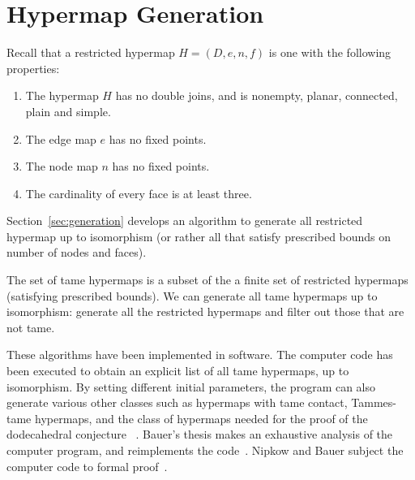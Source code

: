 \section{Hypermap Generation}\label{sec:hyper-gener}

Recall that a restricted hypermap  $H = (D,e,n,f)$ is one with the following 
properties:
\begin{enumerate}
\item The hypermap $H$ has no double joins, and is nonempty, planar,
  connected, plain and simple.
\item The edge map $e$ has no fixed points.  %
\item The node map $n$ has no fixed points.
\item The cardinality of every face is at least three.
\end{enumerate}

Section~\ref{sec:generation} develops an algorithm to generate all
restricted hypermap up to isomorphism (or rather all that satisfy
prescribed bounds on number of nodes and faces).

The set of tame hypermaps is a subset of the a finite set of
restricted hypermaps (satisfying prescribed bounds).  We can generate
all tame hypermaps up to isomorphism: generate all the restricted
hypermaps and filter out those that are not tame.

These algorithms have been implemented in software.  The computer code
has been executed to obtain an explicit list of all tame hypermaps, up
to isomorphism.  By setting different initial parameters, the program
can also generate various other classes such as hypermaps with tame
contact, Tammes-tame hypermaps, and the class of hypermaps needed for
the proof of the dodecahedral conjecture
~\cite{Hales:2010:Dodec}. %
Bauer's thesis makes an exhaustive analysis of the computer
program, and reimplements the code~\cite{Bauer:2006:Thesis}.  Nipkow and
Bauer subject the computer code to formal proof~\cite{Nipkow:2005:Tame}.



